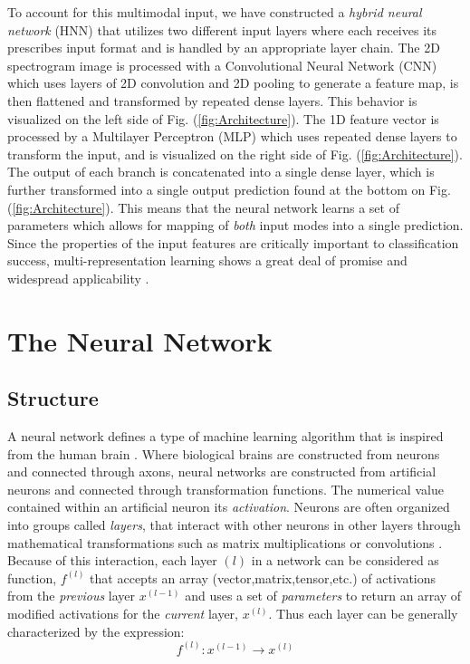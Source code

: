\documentclass[conference,onecolumn,letterpaper]{IEEEtran}
\begin{document}
To account for this multimodal input, we have constructed a \textit{hybrid neural network} (HNN) that utilizes two different input layers where each receives its prescribes input format and is handled by an appropriate layer chain. The 2D spectrogram image is processed with a Convolutional Neural Network (CNN) which uses layers of 2D convolution and 2D pooling to generate a feature map, is then flattened and transformed by repeated dense layers. This behavior is visualized on the left side of Fig. (\ref{fig:Architecture}). The 1D feature vector is processed by a Multilayer Perceptron (MLP) which uses repeated dense layers to transform the input, and is visualized on the right side of Fig. (\ref{fig:Architecture}). The output of each branch is concatenated into a single dense layer, which is further transformed into a single output prediction found at the bottom on Fig. (\ref{fig:Architecture}). This means that the neural network learns a set of parameters which allows for mapping of \textit{both} input modes into a single prediction. Since the properties of the input features are critically important to classification success, multi-representation learning shows a great deal of promise and widespread applicability \cite{Khan,Li,Liu,Virtanen}. 


\section{The Neural Network}
\label{sec:NeuralNetwork}


\subsection{Structure}
\label{subsec:structure}

A neural network defines a type of machine learning algorithm that is inspired from the human brain \cite{Geron,Goodfellow}. Where biological brains are constructed from neurons and connected through axons, neural networks are constructed from artificial neurons and connected through transformation functions. The numerical value contained within an artificial neuron its \textit{activation}\cite{Levine}. Neurons are often organized into groups called \textit{layers}, that interact with other neurons in other layers through mathematical transformations such as matrix multiplications or convolutions \cite{Goodfellow}. Because of this interaction, each layer $(l)$ in a network can be considered as function, $f^{(l)}$ that accepts an array (vector,matrix,tensor,etc.) of activations from the \textit{previous} layer $x^{(l-1)}$ and uses a set of \textit{parameters} to return an array of modified activations for the \textit{current} layer, $x^{(l)}$. Thus each layer can be generally characterized by the expression:
\begin{equation}
    \label{eqn:LayerFunction}
    f^{(l)} : x^{(l-1)} \rightarrow x^{(l)}
\end{equation}
\end{document}

